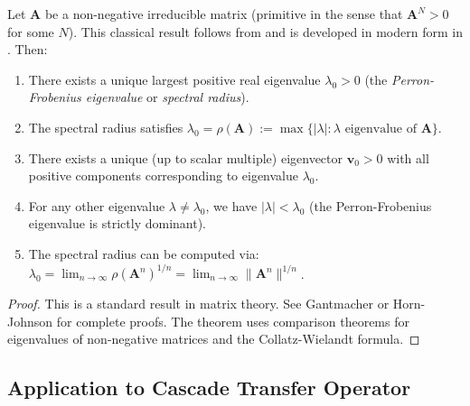 \begin{theorem}
\label{thm:perron-frobenius}
Let $\mathbf{A}$ be a non-negative irreducible matrix (primitive in the sense that $\mathbf{A}^N > 0$ for some $N$). This classical result follows from \cite{Perron1907, Frobenius1912} and is developed in modern form in \cite{Gantmacher1959, Horn2012}. Then:

\begin{enumerate}
\item There exists a unique largest positive real eigenvalue $\lambda_0 > 0$ (the \emph{Perron-Frobenius eigenvalue} or \emph{spectral radius}).
\item The spectral radius satisfies $\lambda_0 = \rho(\mathbf{A}) := \max\{|\lambda| : \lambda \text{ eigenvalue of } \mathbf{A}\}$.
\item There exists a unique (up to scalar multiple) eigenvector $\mathbf{v}_0 > 0$ with all positive components corresponding to eigenvalue $\lambda_0$.
\item For any other eigenvalue $\lambda \neq \lambda_0$, we have $|\lambda| < \lambda_0$ (the Perron-Frobenius eigenvalue is strictly dominant).
\item The spectral radius can be computed via: $\lambda_0 = \lim_{n \to \infty} \rho(\mathbf{A}^n)^{1/n} = \lim_{n \to \infty} \|\mathbf{A}^n\|^{1/n}$.
\end{enumerate}
\end{theorem}

\begin{proof}
This is a standard result in matrix theory. See Gantmacher or Horn-Johnson for complete proofs. The theorem uses comparison theorems for eigenvalues of non-negative matrices and the Collatz-Wielandt formula.
\end{proof}

\subsection{Application to Cascade Transfer Operator}
\label{subsec:cascade-spectral}

